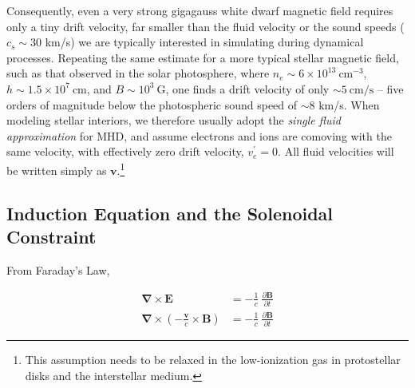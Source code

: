 \documentclass[notoc]{tufte-handout}
\renewcommand{\vec}[1]{\mathbf{#1}}
\newcommand{\del}{\vec{\nabla}}
\newcommand{\E}{\vec{E}}
\newcommand{\B}{\vec{B}}
\begin{document}
Consequently, even a very strong gigagauss white dwarf magnetic field requires only a tiny drift velocity, far smaller than the fluid velocity or the sound speeds ($c_s \sim 30$ km/s) we are typically interested in simulating during dynamical processes.  Repeating the same estimate for a more typical stellar magnetic field, such as that observed in the solar photosphere, where $n_e \sim 6 \times 10^{13}~$cm$^{-3}$, $h\sim 1.5\times 10^{7}~$cm, and $B\sim 10^3~$G, one finds a drift velocity of only $\sim 5~\text{cm/s}$ -- five orders of magnitude below the photospheric sound speed of $\sim 8$ km/s. When modeling stellar interiors, we therefore usually adopt the \textit{single fluid approximation} for MHD, and assume electrons and ions  are comoving with the same velocity, with effectively zero drift velocity, $v_e^\prime=0$. All fluid velocities will be written simply as $\vec {v}$.\footnote{This assumption needs to be relaxed in the low-ionization gas in protostellar disks and the interstellar medium.}

\subsection{Induction Equation and the Solenoidal Constraint}

From Faraday's Law,

\begin{align}
    \del \times \E & = - \frac{1}{c}~\frac{\partial \B}{\partial t} \\
    \del \times \left( - \frac{\vec{v}}{c} \times \B  \right) & = - \frac{1}{c}~\frac{\partial \B}{\partial t}
\end{align}
\end{document}
